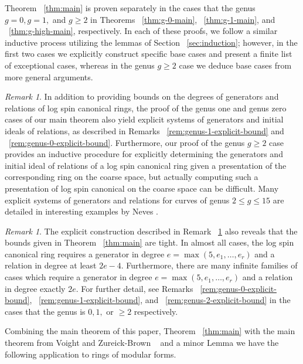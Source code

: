 \documentclass{amsart}
\theoremstyle{plain}
\theoremstyle{definition}
\theoremstyle{remark}
\newtheorem{rem}[thm]{Remark}
\numberwithin{equation}{section}
\begin{document}
Theorem ~\ref{thm:main} is proven separately in the cases that the genus $g = 0, g = 1,$ and $g \geq 2$ in Theorems ~\ref{thm:g-0-main}, ~\ref{thm:g-1-main}, and ~\ref{thm:g-high-main}, respectively.  In each of these proofs, we follow a similar inductive process utilizing the lemmas of Section ~\ref{sec:induction}; however, in the first two cases we explicitly construct specific base cases and present a finite list of exceptional cases, whereas in the genus $g \geq 2$ case we deduce base cases from more general arguments.

\begin{rem}
\label{rem:explicit-generators}
In addition to providing bounds on the degrees of generators and relations of log spin canonical rings, the proof
of the genus one and genus zero cases of our main theorem also yield explicit systems
of generators and initial ideals of relations, as described in Remarks ~\ref{rem:genus-1-explicit-bound} and ~\ref{rem:genus-0-explicit-bound}.
Furthermore, our proof of the genus $g \geq 2$ case provides
an inductive procedure for explicitly determining the generators
and initial ideal of relations of a log spin canonical ring given a presentation of the corresponding ring on the coarse space, but actually computing such a presentation of log spin canonical on the coarse space can be difficult.  Many
explicit systems of generators and relations for curves of genus $2
\leq g \leq 15$ are detailed in interesting examples by Neves
\cite[Section III.4]{neves:halfcan}. 
\end{rem}

\begin{rem}
The explicit construction described in Remark ~\ref{rem:explicit-generators} also reveals that the bounds given in Theorem ~\ref{thm:main} are tight.
In almost all cases, the log spin canonical ring requires a generator in degree $e = \max(5, e_1, \ldots, e_r)$ and a relation in degree at least $2e-4$. 
Furthermore, there are many infinite families of cases which require a generator in degree $e = \max(5, e_1, \ldots, e_r)$ and a relation in degree exactly $2e$. For further detail, see Remarks ~\ref{rem:genus-0-explicit-bound}, ~\ref{rem:genus-1-explicit-bound}, and ~\ref{rem:genus-2-explicit-bound} in the cases that the genus is $0,1,$ or $\geq 2$ respectively.
\end{rem}

Combining the main theorem of this paper, Theorem ~\ref{thm:main} with the main theorem from Voight and Zureick-Brown ~\cite
[Theorem 1.4]{vzb:stacky} and a minor Lemma \cite[Lemma 10.2.1]{vzb:stacky}
we have the following application to
rings of modular forms.
\end{document}
